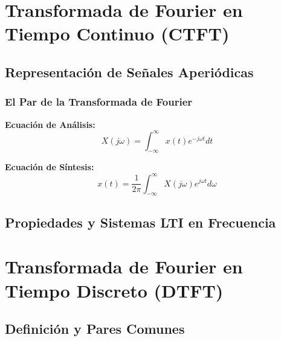 \documentclass[11pt,a4paper,openany]{book}
\begin{document}

\chapter{Transformada de Fourier en Tiempo Continuo (CTFT)}

\section{Representación de Señales Aperiódicas}

\subsection{El Par de la Transformada de Fourier}

\textbf{Ecuación de Análisis:}
\begin{equation}
	X(j\omega) = \int_{-\infty}^{\infty} x(t) e^{-j\omega t} dt
\end{equation}

\textbf{Ecuación de Síntesis:}
\begin{equation}
	x(t) = \frac{1}{2\pi} \int_{-\infty}^{\infty} X(j\omega) e^{j\omega t} d\omega
\end{equation}


\section{Propiedades y Sistemas LTI en Frecuencia}



\chapter{Transformada de Fourier en Tiempo Discreto (DTFT)}

\section{Definición y Pares Comunes}
\end{document}
